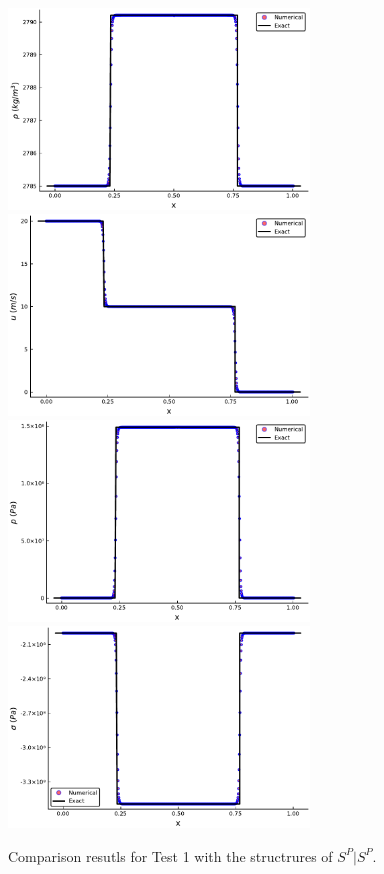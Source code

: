 \documentclass{article}
\numberwithin{equation}{section}
\numberwithin{table}{section}
\begin{document}
\begin{figure}
  \centering

\includegraphics[width= 8cm] {case1rho.pdf}
\includegraphics[width= 8cm] {case1u.pdf}
\includegraphics[width= 8cm] {case1p.pdf}
\includegraphics[width= 8cm] {case1sigma.pdf}

    \caption{Comparison resutls for Test 1 with the structrures of $S^P|S^P$.  }
  \label{fig:case1}
\end{figure}
\end{document}
